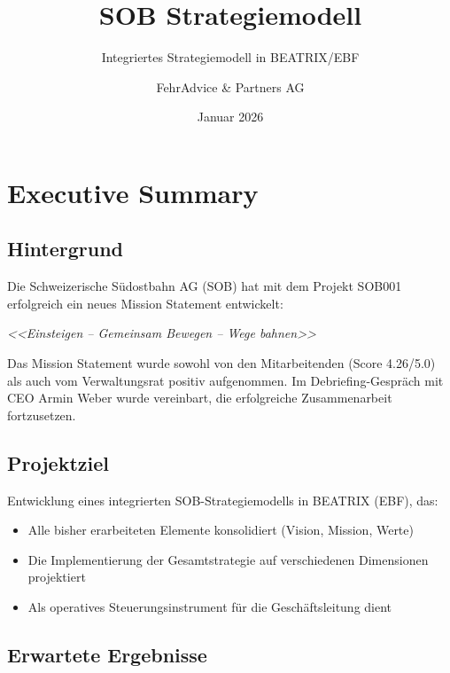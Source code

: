 \documentclass{fehradvice-report}
\title{SOB Strategiemodell}
\subtitle{Integriertes Strategiemodell in BEATRIX/EBF}
\author{FehrAdvice \& Partners AG}
\date{Januar 2026}
\begin{document}
\maketitle

\tableofcontents
\newpage

\section{Executive Summary}

\subsection{Hintergrund}

Die Schweizerische Südostbahn AG (SOB) hat mit dem Projekt SOB001 erfolgreich ein neues Mission Statement entwickelt:

\begin{center}
\textit{<<Einsteigen -- Gemeinsam Bewegen -- Wege bahnen>>}
\end{center}

Das Mission Statement wurde sowohl von den Mitarbeitenden (Score 4.26/5.0) als auch vom Verwaltungsrat positiv aufgenommen. Im Debriefing-Gespräch mit CEO Armin Weber wurde vereinbart, die erfolgreiche Zusammenarbeit fortzusetzen.

\subsection{Projektziel}

\begin{fainfobox}
Entwicklung eines integrierten SOB-Strategiemodells in BEATRIX (EBF), das:
\begin{itemize}
    \item Alle bisher erarbeiteten Elemente konsolidiert (Vision, Mission, Werte)
    \item Die Implementierung der Gesamtstrategie auf verschiedenen Dimensionen projektiert
    \item Als operatives Steuerungsinstrument für die Geschäftsleitung dient
\end{itemize}
\end{fainfobox}

\subsection{Erwartete Ergebnisse}
\end{document}
